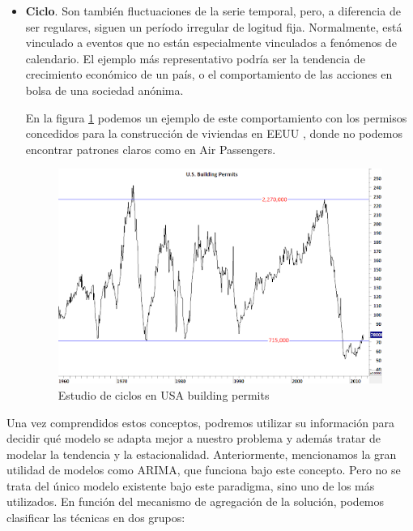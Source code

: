 \begin{itemize}
	\item \textbf{Ciclo}. Son también fluctuaciones de la serie temporal, pero, a diferencia de ser regulares, siguen un período irregular de logitud fija. Normalmente, está vinculado a eventos que no están especialmente vinculados a fenómenos de calendario. El ejemplo más representativo podría ser la tendencia de crecimiento económico de un país, o el comportamiento de las acciones en bolsa de una sociedad anónima. 
	
	En la figura \ref{ciclo} podemos un ejemplo de este comportamiento con los permisos concedidos para la construcción de viviendas en EEUU \cite{techcharts2012housing}, donde no podemos encontrar patrones claros como en Air Passengers.
	
			\begin{figure}[H] %
		\centering
		\includegraphics[scale=0.55]{img/ciclo}
		\caption{Estudio de ciclos en USA building permits}
		\label{ciclo}
	\end{figure}  	
	
\end{itemize}

Una vez comprendidos estos conceptos, podremos utilizar su información para decidir qué modelo se adapta mejor a nuestro problema y además tratar de modelar la tendencia y la estacionalidad. Anteriormente, mencionamos la gran utilidad de modelos como ARIMA, que funciona bajo este concepto. Pero no se trata del único modelo existente bajo este paradigma, sino uno de los más utilizados. En función del mecanismo de agregación de la solución, podemos clasificar las técnicas en dos grupos:

